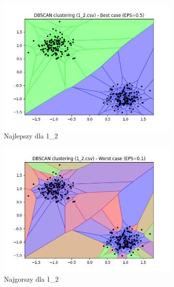 \documentclass[12pt]{article}
\begin{document}
\begin{figure}[H]
\begin{subfigure}[b]{0.24\textwidth}
        \includegraphics[width=\linewidth]{img/exp_1/dbscan/1_2_best.png}
        \caption{Najlepszy dla 1\_2}
    \end{subfigure}
    \hfill
    \begin{subfigure}[b]{0.24\textwidth}
        \includegraphics[width=\linewidth]{img/exp_1/dbscan/1_2_worst.png}
        \caption{Najgorszy dla 1\_2}
    \end{subfigure}
    \begin{subfigure}[b]{0.24\textwidth}

\end{subfigure}
\end{figure}
\end{document}

